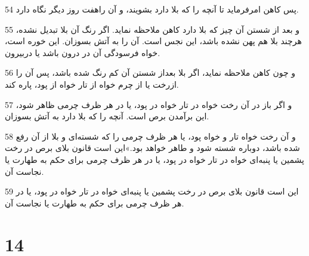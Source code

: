 \par 54 پس کاهن امرفرماید تا آنچه را که بلا دارد بشویند، و آن راهفت روز دیگر نگاه دارد.
\par 55 و بعد از شستن آن چیز که بلا دارد کاهن ملاحظه نماید. اگر رنگ آن بلا تبدیل نشده، هر‌چند بلا هم پهن نشده باشد، این نجس است. آن را به آتش بسوزان. این خوره است، خواه فرسودگی آن در درون باشد یا دربیرون.
\par 56 و چون کاهن ملاحظه نماید، اگر بلا بعداز شستن آن کم رنگ شده باشد، پس آن را ازرخت یا از چرم خواه از تار خواه از پود، پاره کند.
\par 57 و اگر باز در آن رخت خواه در تار خواه در پود، یا در هر ظرف چرمی ظاهر شود، این برآمدن برص است. آنچه را که بلا دارد به آتش بسوزان.
\par 58 و آن رخت خواه تار و خواه پود، یا هر ظرف چرمی را که شسته‌ای و بلا از آن رفع شده باشد، دوباره شسته شود و طاهر خواهد بود.»این است قانون بلای برص در رخت پشمین یا پنبه‌ای خواه در تار خواه در پود، یا در هر ظرف چرمی برای حکم به طهارت یا نجاست آن.
\par 59 این است قانون بلای برص در رخت پشمین یا پنبه‌ای خواه در تار خواه در پود، یا در هر ظرف چرمی برای حکم به طهارت یا نجاست آن.
 
\chapter{14}

